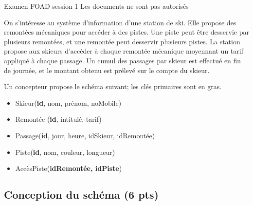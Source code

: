 %
{Examen FOAD session 1}%
{Les documents ne sont pas autorisés}%

On s'intéresse au système d'information d'une station de ski. Elle propose
des remontées mécaniques pour accéder à des pistes. Une piste
peut être desservie par plusieurs remontées, et une remontée peut desservir 
plusieurs pistes.
La station propose
aux skieurs d'accéder à chaque remontée mécanique moyennant un tarif 
appliqué à chaque passage. 
Un cumul des passages par skieur est effectué
                 en fin de journée, et le montant obtenu
                est prélevé sur le compte du skieur.

Un concepteur propose le schéma suivant; les clés primaires sont en gras.

\begin{itemize}
\item Skieur(\textbf{id}, nom, prénom, noMobile)
\item Remontée (\textbf{id}, intitulé, tarif)
\item Passage(\textbf{id}, jour, heure, idSkieur, idRemontée)
\item Piste(\textbf{id}, nom, couleur, longueur)
\item AccèsPiste(\textbf{idRemontée, idPiste})

\end{itemize}

\subsection*{Conception du schéma (6 pts)}

